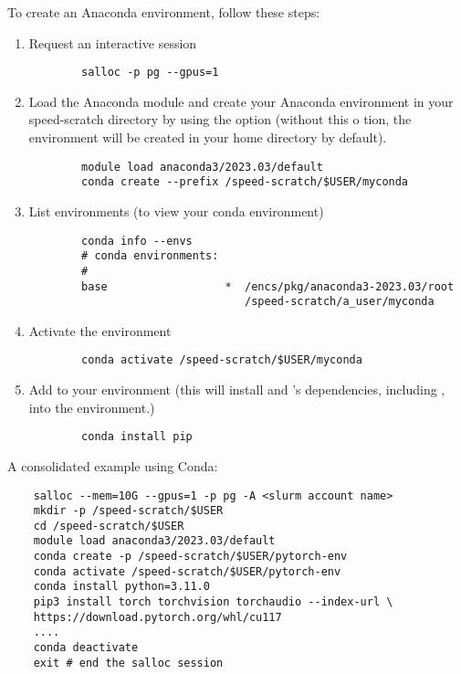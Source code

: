 To create an Anaconda environment, follow these steps:
\begin{enumerate}
	\item Request an interactive session
	\begin{verbatim}
		salloc -p pg --gpus=1
	\end{verbatim}

	\item Load the Anaconda module and create your Anaconda environment in your speed-scratch directory by using
	the  option (without this o tion, the environment will be created in your home directory by default).
	\begin{verbatim}
		module load anaconda3/2023.03/default
		conda create --prefix /speed-scratch/$USER/myconda
	\end{verbatim}

	\item List environments (to view your conda environment)
	\begin{verbatim}
		conda info --envs
		# conda environments:
		#
		base                  *  /encs/pkg/anaconda3-2023.03/root
                         		 /speed-scratch/a_user/myconda
	\end{verbatim}

	\item Activate the environment
	\begin{verbatim}
		conda activate /speed-scratch/$USER/myconda
	\end{verbatim}

	\item Add  to your environment (this will install  and 's dependencies,
	including , into the environment.)
	\begin{verbatim}
		conda install pip
	\end{verbatim}
\end{enumerate}

\noindent A consolidated example using Conda:
\begin{verbatim}
    salloc --mem=10G --gpus=1 -p pg -A <slurm account name>
    mkdir -p /speed-scratch/$USER
    cd /speed-scratch/$USER
    module load anaconda3/2023.03/default
    conda create -p /speed-scratch/$USER/pytorch-env
    conda activate /speed-scratch/$USER/pytorch-env
    conda install python=3.11.0
    pip3 install torch torchvision torchaudio --index-url \
    https://download.pytorch.org/whl/cu117
    ....
    conda deactivate
    exit # end the salloc session
\end{verbatim}

